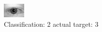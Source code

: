 \begin{figure}[h!]
\begin{center}
\includegraphics[width=0.60\columnwidth]{figures/ID640_class_2_target_3.png}
\end{center}
\caption{ Classification: 2 actual target: 3}
\label{fig:ID640_class_2_target_3}
\end{figure}
